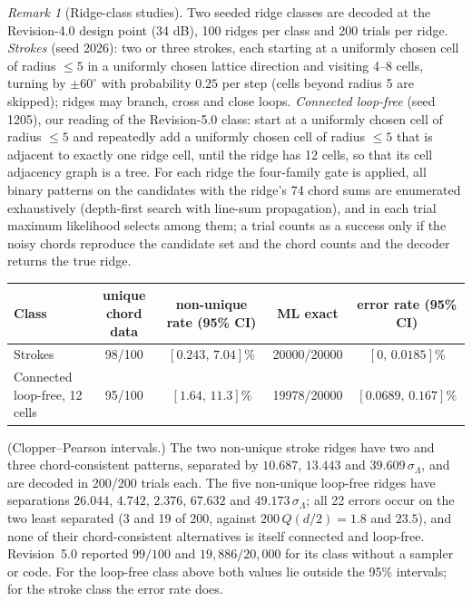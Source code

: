 \documentclass[11pt,a4paper]{article}
\theoremstyle{definition}
\theoremstyle{remark}
\newtheorem{remark}[theorem]{Remark}
\begin{document}
\begin{remark}[Ridge-class studies]\label{rem:classes}
Two seeded ridge classes are decoded at the Revision-4.0 design point (34 dB), 100 ridges per class and 200 trials per ridge. \emph{Strokes} (seed 2026): two or three strokes, each starting at a uniformly chosen cell of radius $\le5$ in a uniformly chosen lattice direction and visiting 4--8 cells, turning by $\pm60^\circ$ with probability $0.25$ per step (cells beyond radius 5 are skipped); ridges may branch, cross and close loops. \emph{Connected loop-free} (seed 1205), our reading of the Revision-5.0 class: start at a uniformly chosen cell of radius $\le5$ and repeatedly add a uniformly chosen cell of radius $\le5$ that is adjacent to exactly one ridge cell, until the ridge has 12 cells, so that its cell adjacency graph is a tree. For each ridge the four-family gate is applied, all binary patterns on the candidates with the ridge's 74 chord sums are enumerated exhaustively (depth-first search with line-sum propagation), and in each trial maximum likelihood selects among them; a trial counts as a success only if the noisy chords reproduce the candidate set and the chord counts and the decoder returns the true ridge.
\begin{center}\small
\begin{tabular}{@{}lcccc@{}}
\toprule
Class & unique chord data & non-unique rate (95\% CI) & ML exact & error rate (95\% CI) \\
\midrule
Strokes & 98/100 & $[0.243,\,7.04]\%$ & 20000/20000 & $[0,\,0.0185]\%$ \\
Connected loop-free, 12 cells & 95/100 & $[1.64,\,11.3]\%$ & 19978/20000 & $[0.0689,\,0.167]\%$ \\
\bottomrule
\end{tabular}
\end{center}
(Clopper--Pearson intervals.) The two non-unique stroke ridges have two and three chord-consistent patterns, separated by $10.687$, $13.443$ and $39.609\,\sigma_\Lambda$, and are decoded in 200/200 trials each. The five non-unique loop-free ridges have separations $26.044$, $4.742$, $2.376$, $67.632$ and $49.173\,\sigma_\Lambda$; all 22 errors occur on the two least separated (3 and 19 of 200, against $200\,Q(d/2) = 1.8$ and $23.5$), and none of their chord-consistent alternatives is itself connected and loop-free. Revision~5.0 reported $99/100$ and $19{,}886/20{,}000$ for its class without a sampler or code. For the loop-free class above both values lie outside the 95\% intervals; for the stroke class the error rate does.
\end{remark}
\end{document}

